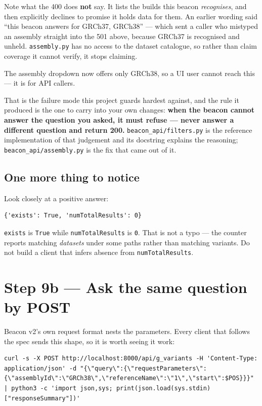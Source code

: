 \documentclass[
  10pt,
]{article}
\begin{document}
Note what the 400 does \textbf{not} say. It lists the builds this beacon
\emph{recognises}, and then explicitly declines to promise it holds data
for them. An earlier wording said ``this beacon answers for GRCh37,
GRCh38'' --- which sent a caller who mistyped an assembly straight into
the 501 above, because GRCh37 is recognised and unheld.
\texttt{assembly.py} has no access to the dataset catalogue, so rather
than claim coverage it cannot verify, it stops claiming.

The assembly dropdown now offers only GRCh38, so a UI user cannot reach
this --- it is for API callers.

That is the failure mode this project guards hardest against, and the
rule it produced is the one to carry into your own changes: \textbf{when
the beacon cannot answer the question you asked, it must refuse ---
never answer a different question and return 200.}
\texttt{beacon\_api/filters.py} is the reference implementation of that
judgement and its docstring explains the reasoning;
\texttt{beacon\_api/assembly.py} is the fix that came out of it.

\subsection{One more thing to notice}\label{one-more-thing-to-notice}

Look closely at a positive answer:

\begin{verbatim}
{'exists': True, 'numTotalResults': 0}
\end{verbatim}

\texttt{exists} is \texttt{True} while \texttt{numTotalResults} is
\texttt{0}. That is not a typo --- the counter reports matching
\emph{datasets} under some paths rather than matching variants. Do not
build a client that infers absence from \texttt{numTotalResults}.

\section{Step 9b --- Ask the same question by
POST}\label{step-9b-ask-the-same-question-by-post}

Beacon v2's own request format nests the parameters. Every client that
follows the spec sends this shape, so it is worth seeing it work:

\begin{verbatim}
curl -s -X POST http://localhost:8000/api/g_variants -H 'Content-Type: application/json' -d "{\"query\":{\"requestParameters\":{\"assemblyId\":\"GRCh38\",\"referenceName\":\"1\",\"start\":$POS}}}" | python3 -c 'import json,sys; print(json.load(sys.stdin)["responseSummary"])'
\end{verbatim}
\end{document}
